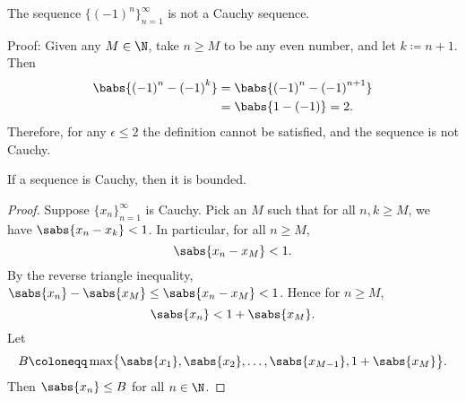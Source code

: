 \begin{example}
The sequence $\bigl\{ {(-1)}^n \bigr\}_{n=1}^\infty$ is not a Cauchy sequence.

Proof:
Given any $M \in \N$, take $n \geq M$ to be any even number, and
let $k \coloneqq n+1$.  Then
\begin{equation*}
\begin{split}
\babs{{(-1)}^n - {(-1)}^k}
& =
\babs{{(-1)}^n - {(-1)}^{n+1}}
\\
& =
\babs{1 - (-1)} = 2 .
\end{split}
\end{equation*}
Therefore, for any $\epsilon \leq 2$ the definition cannot be satisfied, and
the sequence is not Cauchy.
\end{example}

%

\begin{prop}
If a sequence is Cauchy, then it is bounded.
\end{prop}

\begin{proof}
Suppose $\{ x_n \}_{n=1}^\infty$ is Cauchy.  Pick an $M$ such that for all
$n,k \geq M$, we have $\sabs{x_n-x_k} < 1$.  In particular, 
for all $n \geq M$,
\begin{equation*}
\sabs{x_n - x_M} < 1 .
\end{equation*}
By the reverse triangle inequality,
$\sabs{x_n} - \sabs{x_M} \leq \sabs{x_n - x_M} < 1$.  Hence for $n \geq M$,
\begin{equation*}
\sabs{x_n} < 1 + \sabs{x_M}.
\end{equation*}
Let
\begin{equation*}
B \coloneqq \max \bigl\{ \sabs{x_1}, \sabs{x_2}, \ldots,
\sabs{x_{M-1}}, 1+ \sabs{x_M} \bigr\} .
\end{equation*}
Then $\sabs{x_n} \leq B$ for all $n \in \N$.
\end{proof}

